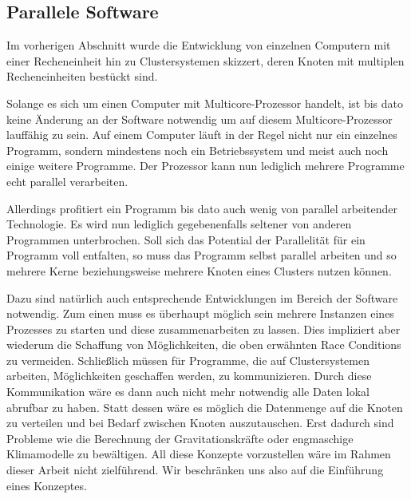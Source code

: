     \subsection{Parallele Software}
      Im vorherigen Abschnitt wurde die Entwicklung von einzelnen Computern mit einer Recheneinheit hin zu Clustersystemen skizzert, deren Knoten mit multiplen Recheneinheiten bestückt sind.
      
      Solange es sich um einen Computer mit Multicore-Prozessor handelt, ist bis dato keine Änderung an der Software notwendig um auf diesem Multicore-Prozessor lauffähig zu sein. 
      Auf einem Computer läuft in der Regel nicht nur ein einzelnes Programm, sondern mindestens noch ein Betriebssystem und meist auch noch einige weitere Programme.
      Der Prozessor kann nun lediglich mehrere Programme echt parallel verarbeiten.
      
      Allerdings profitiert ein Programm bis dato auch wenig von parallel arbeitender Technologie. Es wird nun lediglich gegebenenfalls seltener von anderen Programmen unterbrochen.
      Soll sich das Potential der Parallelität für ein Programm voll entfalten, so muss das Programm selbst parallel arbeiten und so mehrere Kerne beziehungsweise mehrere Knoten eines 
      Clusters nutzen können. 
      
      Dazu sind natürlich auch entsprechende Entwicklungen im Bereich der Software notwendig. Zum einen muss es überhaupt möglich sein mehrere Instanzen eines 
      Prozesses zu starten und diese zusammenarbeiten zu lassen. Dies impliziert aber wiederum die Schaffung von Möglichkeiten, die oben erwähnten Race Conditions zu vermeiden. Schließlich 
      müssen für Programme, die auf Clustersystemen arbeiten, Möglichkeiten geschaffen werden, zu kommunizieren. Durch diese Kommunikation wäre es dann auch nicht mehr notwendig alle Daten
      lokal abrufbar zu haben. Statt dessen wäre es möglich die Datenmenge auf die Knoten zu verteilen und bei Bedarf zwischen Knoten auszutauschen. Erst dadurch sind Probleme wie die 
      Berechnung der Gravitationskräfte oder engmaschige Klimamodelle zu bewältigen.
      All diese Konzepte vorzustellen wäre im Rahmen dieser Arbeit nicht zielführend. Wir beschränken uns also auf die Einführung eines Konzeptes.
      

